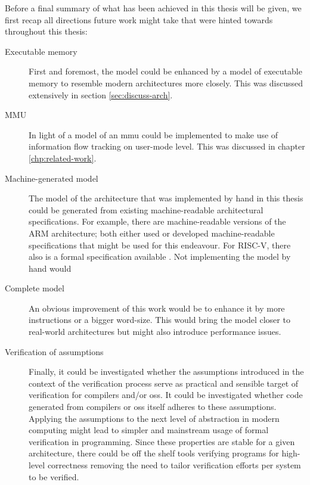 Before a final summary of what has been achieved in this thesis will be given, we first recap all directions future work might take that were hinted towards throughout this thesis:
\begin{description}
    \item[Executable memory] First and foremost, the model could be enhanced by a model of executable memory to resemble modern architectures more closely.
    This was discussed extensively in section \ref{sec:discuss-arch}.
    \item[MMU] In light of \cite{KhakpourSD13} a model of an \gls{mmu} could be implemented to make use of information flow tracking on user-mode level.
    This was discussed in chapter \ref{chp:related-work}.
    \item[Machine-generated model] The model of the architecture that was implemented by hand in this thesis could be generated from existing machine-readable architectural specifications.
    For example, there are machine-readable versions of the ARM architecture; both \cite{Reid17,Fox02} either used or developed machine-readable specifications that might be used for this endeavour.
    For RISC-V, there also is a formal specification available \cite{RiscvSpecFormal}.
    Not implementing the model by hand would 
    \item[Complete model] An obvious improvement of this work would be to enhance it by more instructions or a bigger word-size.
    This would bring the model closer to real-world architectures but might also introduce performance issues.
    \item[Verification of assumptions] Finally, it could be investigated whether the assumptions introduced in the context of the verification process serve as practical and sensible target of verification for compilers and/or \glspl{os}.
    It could be investigated whether code generated from compilers or \glspl{os} itself adheres to these assumptions.
    Applying the assumptions to the next level of abstraction in modern computing might lead to simpler and mainstream usage of formal verification in programming.
    Since these properties are stable for a given architecture, there could be off the shelf tools verifying programs for high-level correctness removing the need to tailor verification efforts per system to be verified.
\end{description}

